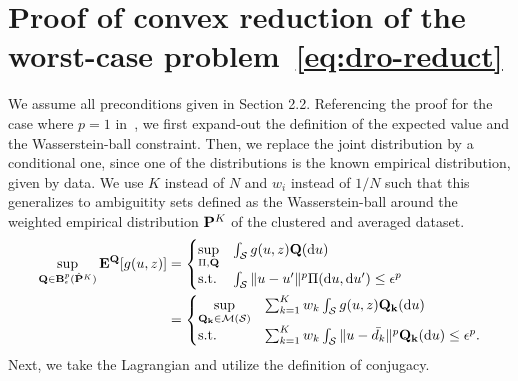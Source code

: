 \section{Proof of convex reduction of the worst-case problem~\eqref{eq:dro-reduct}}
\label{app:convex_red}
We assume all preconditions given in Section 2.2. Referencing the proof for the case where $p=1$ in~\cite{mohajerin_esfahani_data-driven_2018}, we first expand-out the definition of the expected value and the Wasserstein-ball constraint. Then, we replace the joint distribution by a conditional one, since one of the distributions is the known empirical distribution, given by data. We use $K$ instead of $N$ and $w_i$ instead of $1/N$ such that this generalizes to ambiguitity sets defined as the Wasserstein-ball around the weighted empirical distribution ${\mathbf P}^K$ of the clustered and averaged dataset.
\begin{equation*}
\begin{aligned}
  \sup_{\mathbf{Q}\in \mathbf{B}_\epsilon^p(\hat{{\mathbf P}}^K)} \mathbf{E}^\mathbf{Q}[g(u,z)] &=
    \begin{cases}
      \underset{\Pi, \mathbf{Q}}{\sup} & \int_{\mathcal{S}} g(u,z)\mathbf{Q}(\text{d} u)\\
			\text{s.t.} & \int_{\mathcal{S}} \|u - u'\|^p \Pi (\text{d} u,\text{d} u') \leq \epsilon^p
    \end{cases} \\
		&=   \begin{cases}
      \underset{\mathbf{Q_k} \in \mathcal{M}(\mathcal{S})}{\sup} & \sum_{k = 1}^K w_k \int_{\mathcal{S}} g(u,z)\mathbf{Q_k}(\text{d} u)\\
			\text{s.t.} &  \sum_{k = 1}^K w_k \int_{\mathcal{S}} \|u - \bar{d_k}\|^p \mathbf{Q_k}(\text{d} u) \leq \epsilon^p.
    \end{cases} \\
\end{aligned}
\end{equation*}
Next, we take the Lagrangian and utilize the definition of conjugacy.
